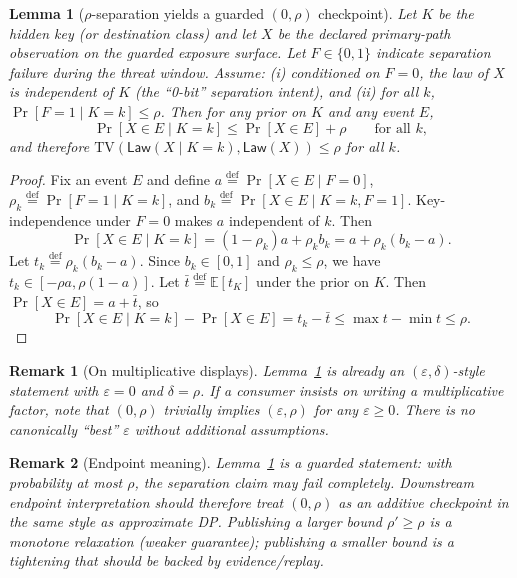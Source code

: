 \documentclass[11pt]{article}
\newtheorem{lemma}{Lemma}
\newtheorem{remark}{Remark}
\newcommand{\defeq}{\stackrel{\mathrm{def}}{=}}
\newcommand{\TV}{\mathrm{TV}}
\newcommand{\Law}{\mathsf{Law}}
\newcommand{\EE}{\mathbb{E}}
\begin{document}
\begin{lemma}[$\rho$-separation yields a guarded $(0,\rho)$ checkpoint]
\label{lem:rho}
Let $K$ be the hidden key (or destination class) and let $X$ be the declared primary-path observation on the guarded exposure surface.
Let $F\in\{0,1\}$ indicate separation failure during the threat window.
Assume:
(i) conditioned on $F=0$, the law of $X$ is independent of $K$ (the ``0-bit'' separation intent), and
(ii) for all $k$, $\Pr[F=1\mid K=k]\le \rho$.
Then for any prior on $K$ and any event $E$,
\[
\Pr[X\in E\mid K=k] \le \Pr[X\in E] + \rho
\qquad\text{for all }k,
\]
and therefore $\TV(\Law(X\mid K=k),\Law(X))\le \rho$ for all $k$.
\end{lemma}

\begin{proof}
Fix an event $E$ and define
$a\defeq \Pr[X\in E\mid F=0]$,
$\rho_k\defeq \Pr[F=1\mid K=k]$, and
$b_k\defeq \Pr[X\in E\mid K=k,F=1]$.
Key-independence under $F=0$ makes $a$ independent of $k$.
Then
\[
\Pr[X\in E\mid K=k] = (1-\rho_k)a + \rho_k b_k = a + \rho_k(b_k-a).
\]
Let $t_k\defeq \rho_k(b_k-a)$.
Since $b_k\in[0,1]$ and $\rho_k\le\rho$, we have
$t_k\in[-\rho a,\rho(1-a)]$.
Let $\bar t\defeq \EE[t_K]$ under the prior on $K$.
Then $\Pr[X\in E]=a+\bar t$, so
\[
\Pr[X\in E\mid K=k]-\Pr[X\in E] = t_k-\bar t \le \max t - \min t \le \rho.
\]
\end{proof}

\begin{remark}[On multiplicative displays]
Lemma~\ref{lem:rho} is already an $(\varepsilon,\delta)$-style statement with $\varepsilon=0$ and $\delta=\rho$.
If a consumer insists on writing a multiplicative factor, note that $(0,\rho)$ trivially implies $(\varepsilon,\rho)$ for any $\varepsilon\ge 0$.
There is no canonically ``best'' $\varepsilon$ without additional assumptions.
\end{remark}

\begin{remark}[Endpoint meaning]
Lemma~\ref{lem:rho} is a \emph{guarded} statement: with probability at most $\rho$, the separation claim may fail completely.
Downstream endpoint interpretation should therefore treat $(0,\rho)$ as an additive checkpoint in the same style as approximate DP.\cite{series:oddsinflation}
Publishing a larger bound $\rho'\ge\rho$ is a monotone \emph{relaxation} (weaker guarantee); publishing a smaller bound is a \emph{tightening} that should be backed by evidence/replay.
\end{remark}
\end{document}
